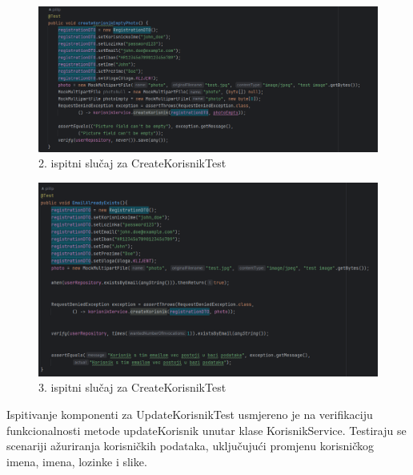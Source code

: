 \begin{figure}[H]
	\includegraphics[width=\textwidth]{slike/korisnikslika.png} %
	\centering
	\caption{2. ispitni slučaj za CreateKorisnikTest}
	\label{fig:dijagramstanja}
\end{figure}

\begin{figure}[H]
	\includegraphics[width=\textwidth]{slike/email.png} %
	\centering
	\caption{3. ispitni slučaj za CreateKorisnikTest}
	\label{fig:dijagramstanja}
\end{figure}

Ispitivanje komponenti za UpdateKorisnikTest usmjereno je na verifikaciju funkcionalnosti metode updateKorisnik unutar klase KorisnikService. Testiraju se scenariji ažuriranja korisničkih podataka, uključujući promjenu korisničkog imena, imena, lozinke i slike.


